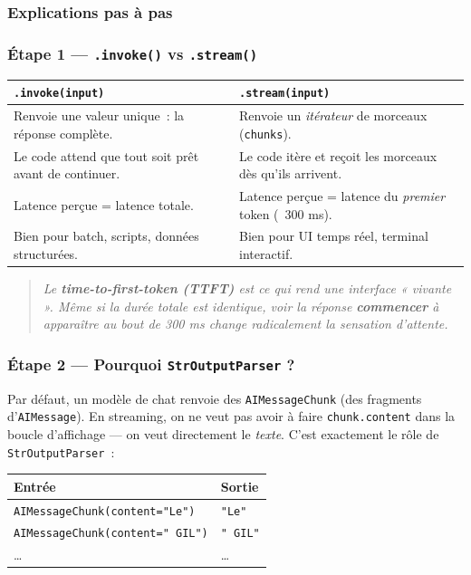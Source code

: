 \documentclass[11pt,a4paper]{article}
\begin{document}
\subsubsection{Explications pas à pas}

\subsubsection*{Étape 1 — \texttt{.invoke()} vs \texttt{.stream()}}

\begin{center}
\begin{tabular}{p{6.5cm} p{6.5cm}}
\toprule
\textbf{\texttt{.invoke(input)}} & \textbf{\texttt{.stream(input)}} \\
\midrule
Renvoie une valeur unique~: la réponse complète. & Renvoie un \emph{itérateur} de morceaux (\texttt{chunks}). \\
Le code attend que tout soit prêt avant de continuer. & Le code itère et reçoit les morceaux dès qu'ils arrivent. \\
Latence perçue = latence totale. & Latence perçue = latence du \emph{premier} token (~300 ms). \\
Bien pour batch, scripts, données structurées. & Bien pour UI temps réel, terminal interactif. \\
\bottomrule
\end{tabular}
\end{center}

\begin{quote}\itshape
Le \textbf{time-to-first-token (TTFT)} est ce qui rend une interface
« vivante ». Même si la durée totale est identique, voir la réponse
\textbf{commencer} à apparaître au bout de 300 ms change radicalement la
sensation d'attente.
\end{quote}

\subsubsection*{Étape 2 — Pourquoi \texttt{StrOutputParser} ?}

Par défaut, un modèle de chat renvoie des \texttt{AIMessageChunk} (des
fragments d'\texttt{AIMessage}). En streaming, on ne veut pas avoir à
faire \texttt{chunk.content} dans la boucle d'affichage — on veut
directement le \emph{texte}. C'est exactement le rôle de
\texttt{StrOutputParser}~:

\begin{center}
\begin{tabular}{ll}
Entrée & Sortie \\
\midrule
\texttt{AIMessageChunk(content="Le")}  & \texttt{"Le"} \\
\texttt{AIMessageChunk(content=" GIL")} & \texttt{" GIL"} \\
\dots & \dots \\
\end{tabular}
\end{center}
\end{document}
